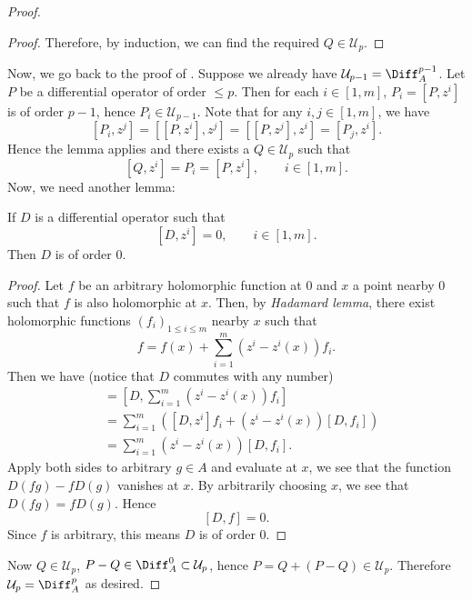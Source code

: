 \begin{proof}
\begin{proof}
Therefore, by induction, we can find the required $Q\in\mathcal{U}_p$.
\end{proof}

Now, we go back to the proof of . 
Suppose we already have $\mathcal{U}_{p-1}=\Diff_A^{p-1}$. 
Let $P$ be a differential operator of order $\le p$. 
Then for each $i\in[1,m]$, $P_i=[P,z^i]$ is of order $p-1$, 
hence $P_i\in\mathcal{U}_{p-1}$. 
Note that for any $i,j\in[1,m]$, we have
\[
[P_i,z^j]=[[P,z^i],z^j]=[[P,z^j],z^i]=[P_j,z^i].
\]
Hence the lemma applies and there exists a $Q\in\mathcal{U}_p$ such that 
\[
[Q,z^i]=P_i=[P,z^i],\qquad i\in[1,m].
\]
Now, we need another lemma:
\begin{lem}
If $D$ is a differential operator such that 
\[
[D,z^i]=0,\qquad i\in[1,m].
\]
Then $D$ is of order $0$.
\end{lem}
\begin{proof}
Let $f$ be an arbitrary holomorphic function at $0$ 
and $x$ a point nearby $0$ such that $f$ is also holomorphic at $x$. 
Then, by \emph{Hadamard lemma}, 
there exist holomorphic functions $(f_i)_{1\le i\le m}$ nearby $x$ 
such that
\[
f=f(x)+\sum_{i=1}^m(z^i-z^i(x))f_i.
\]
Then we have (notice that $D$ commutes with any number)
\begin{align*}
[D,f]&=[D,\sum_{i=1}^m(z^i-z^i(x))f_i]\\
&=\sum_{i=1}^m([D,z^i]f_i+(z^i-z^i(x))[D,f_i])\\
&=\sum_{i=1}^m(z^i-z^i(x))[D,f_i].
\end{align*}
Apply both sides to arbitrary $g\in A$ and evaluate at $x$, 
we see that the function $D(fg)-fD(g)$ vanishes at $x$. 
By arbitrarily choosing $x$, we see that $D(fg)=fD(g)$. 
Hence
\[
[D,f]=0.
\]
Since $f$ is arbitrary, this means $D$ is of order $0$. 
\end{proof}

Now $Q\in\mathcal{U}_p$, $P-Q\in\Diff_A^0\subset\mathcal{U}_p$, 
hence $P=Q+(P-Q)\in\mathcal{U}_p$.
Therefore $\mathcal{U}_p=\Diff_A^p$ as desired.
\end{proof}

